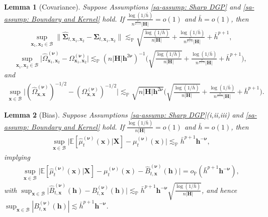 \documentclass[10pt]{article}
\newtheorem{lem}{Lemma}
\renewcommand{\P}{\mathbb{P}}
\newcommand{\E}{\mathbb{E}}
\newcommand{\lessp}{\lesssim_{\mathbb{P}}}
\newcommand{\bh}{\mathbf{h}}
\newcommand{\bH}{\mathbf{H}}
\newcommand{\bx}{\mathbf{x}}
\newcommand{\bX}{\mathbf{X}}
\newcommand{\bnu}{\boldsymbol{\nu}}
\newcommand{\bSigma}{\boldsymbol{\Sigma}}
\newcommand{\B}{\mathcal{B}}
\begin{document}
\begin{lem}[Covariance]\label{sa-lem: covariance}
    Suppose Assumptions \ref{sa-assump: Sharp DGP} and \ref{sa-assump: Boundary and Kernel} hold. If $\frac{\log(1/\bar{h})}{n^{\frac{v}{2+v}} |\bH|} = o(1)$ and $\bar{h}=o(1)$, then
    \begin{align*}
        \sup_{\bx_1,\bx_2 \in \B} \big\|\widehat{\bSigma}_{t, \bx_1,\bx_2} - \bSigma_{t, \bx_1,\bx_2}\big\|
        \lessp \sqrt{\frac{\log(1/\bar{h})}{n |\bH|}} + \frac{\log(1/\bar{h})}{n^{\frac{v}{2+v}}|\bH|} + \bar{h}^{p+1},
    \end{align*}
    \begin{align*}
        \sup_{\bx_1,\bx_2 \in \B} \big|\widehat{\Omega}_{\bx_1,\bx_2}^{(\bnu)} - \Omega_{\bx_1,\bx_2}^{(\bnu)}\big|
        \lessp (n |\bH|\bh^{2\bnu})^{-1}\bigg(\sqrt{\frac{\log(1/\bar{h})}{n |\bH|}} + \frac{\log(1/\bar{h})}{n^{\frac{v}{2+v}}|\bH|}+ \bar{h}^{p+1}\bigg),
    \end{align*}
    and
    \begin{align*}
        \sup_{\bx \in \B} \big|(\widehat{\Omega}_{\bx,\bx}^{(\bnu)})^{-1/2} - (\Omega_{\bx,\bx}^{(\bnu)})^{-1/2} \big|
        \lessp \sqrt{n |\bH|\bh^{2\bnu}}\bigg(\sqrt{\frac{\log(1/\bar{h})}{n |\bH|}} + \frac{\log(1/\bar{h})}{n^{\frac{v}{2+v}}|\bH|} + \bar{h}^{p+1}\bigg).
    \end{align*}
\end{lem}

\begin{lem}[Bias]\label{sa-lem: bias}
    Suppose Assumptions \ref{sa-assump: Sharp DGP}(i,ii,iii) and \ref{sa-assump: Boundary and Kernel} hold. If $\frac{\log(1/\bar{h})}{n |\bH|} = o(1)$ and $\bar{h} = o(1)$, then
    \begin{align*}
        \sup_{\bx \in \B} \big|\E[\widehat{\mu}_t^{(\bnu)}(\bx)|\bX] - \mu_t^{(\bnu)}(\bx)\big| \lessp \bar{h}^{p+1}\bh^{-\bnu},
    \end{align*}
    implying
    \begin{align*}
        \sup_{\bx \in \B} \big|\E[\widehat{\mu}_t^{(\bnu)}(\bx)|\bX] - \mu_t^{(\bnu)}(\bx) - \widehat{B}_{t,\bx}^{(\bnu)}(\bh)\big| = o_{\P}(\bar{h}^{p+1}\bh^{-\bnu}),
    \end{align*}
    with $\sup_{\bx \in \B} \big|\widehat{B}_{t,\bx}^{(\bnu)}(\bh) - B_{t,\bx}^{(\bnu)}(\bh) \big| \lessp \bar{h}^{p+1}\bh^{-\bnu}\sqrt{\frac{\log(1/\bar{h})}{n |\bH|}}$, and hence $\sup_{\bx \in \B}|B_{t,\bx}^{(\bnu)}(\bh)| \lesssim \bar{h}^{p+1}\bh^{-\bnu}$.
\end{lem}
\end{document}
